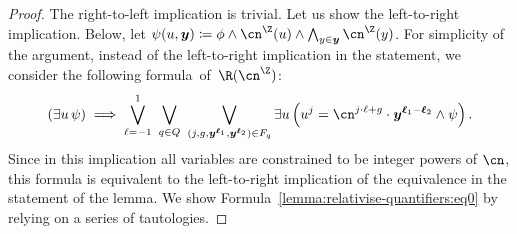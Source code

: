 \begin{proof}
    The right-to-left implication is trivial. Let us show the left-to-right
    implication. Below, let $\psi(u,\vec y) \coloneqq \phi \land \ipow{\cn}(u)
    \land \bigwedge_{y \in \vec y} \ipow{\cn}(y)$. For simplicity of the
    argument, instead of the left-to-right implication in the statement, we
    consider the following formula~of~$\R(\ipow{\cn})$:%
    \begin{equation}
      (\exists u \, \psi)
      \implies 
      \bigvee_{\ell = -1}^{1}\ 
      \bigvee_{q \in Q}\ 
      \bigvee_{(j,g,\vec y^{\vec \ell_1}, \vec y^{\vec \ell_2}) \in F_q}
      \exists u \left( u^{j} = \cn^{j \cdot \ell + g} \cdot \vec y^{\vec \ell_1-\vec \ell_2} \land \psi \right).
      \label{lemma:relativise-quantifiers:eq0}
    \end{equation}
    Since in this implication all variables are constrained to be integer powers
    of $\cn$, this formula is equivalent to the left-to-right implication of the
    equivalence in the statement of the lemma. We show
    Formula~\eqref{lemma:relativise-quantifiers:eq0} by relying on a series of
    tautologies.
  

\end{proof}
